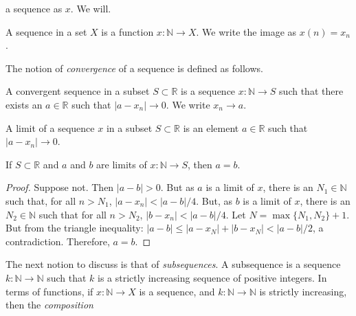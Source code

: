 \documentclass[crop=false,class=book,oneside]{standalone}
\begin{document}
            a sequence as $x$. We will.
            \begin{definition}
                A sequence in a set $X$ is a function
                $x:\mathbb{N}\rightarrow{X}$.
                We write the image as $x(n)=x_{n}$.
            \end{definition}
            The notion of \textit{convergence} of a sequence
            is defined as follows.
            \begin{definition}
                A convergent sequence in a subset
                $S\subset\mathbb{R}$ is a sequence
                $x:\mathbb{N}\rightarrow{S}$
                such that there exists an $a\in\mathbb{R}$ such
                that $|a-x_{n}|\rightarrow{0}$. We write
                $x_{n}\rightarrow{a}$.
            \end{definition}
            \begin{definition}
                A limit of a sequence $x$
                in a subset $S\subset\mathbb{R}$ is an element
                $a\in\mathbb{R}$ such that
                $|a-x_{n}|\rightarrow{0}$.
            \end{definition}
            \begin{theorem}
                If $S\subset\mathbb{R}$ and $a$ and $b$ are limits
                of $x:\mathbb{N}\rightarrow{S}$, then $a=b$.
            \end{theorem}
            \begin{proof}
                Suppose not. Then $|a-b|>0$. But as $a$ is a
                limit of $x$, there is an $N_{1}\in\mathbb{N}$
                such that, for all $n>N_{1}$,
                $|a-x_{n}|<|a-b|/4$. But, as $b$ is a limit
                of $x$, there is an $N_{2}\in\mathbb{N}$
                such that for all $n>N_{2}$,
                $|b-x_{n}|<|a-b|/4$. Let $N=\max\{N_{1},N_{2}\}+1$.
                But from the triangle inequality:
                $|a-b|\leq|a-x_{N}|+|b-x_{N}|<|a-b|/2$, a
                contradiction. Therefore, $a=b$.
            \end{proof}
            The next notion to discuss is that of
            \textit{subsequences}. A subsequence is a sequence
            $k:\mathbb{N}\rightarrow\mathbb{N}$ such that $k$
            is a strictly increasing sequence of positive
            integers. In terms of functions, if
            $x:\mathbb{N}\rightarrow{X}$ is a sequence,
            and $k:\mathbb{N}\rightarrow\mathbb{N}$ is
            strictly increasing, then the \textit{composition}
\end{document}
